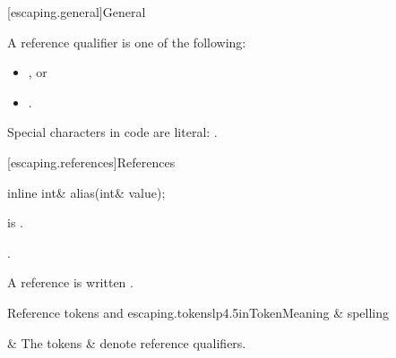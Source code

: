 [escaping.general]{General}

\pnum
A reference qualifier is one of the following:
\begin{itemize}
\item \tcode{\&}, or
\item \tcode{\&\&}.
\end{itemize}
Special characters in code are literal: \tcode{\# \% _ \{ \} \textasciitilde{} \textasciicircum{} \$ \textbackslash{}}.

[escaping.references]{References}

%
\begin{itemdecl}
inline int& alias(int& value);
\end{itemdecl}

\begin{itemdescr}
\pnum
\mandates
{} is .

\pnum
\returns
{}.

\pnum
\remarks
A reference is written .
\begin{libtab2}{Reference tokens \tcode{\&} and \tcode{\&\&}}{escaping.tokens}{lp{4.5in}}{Token}{Meaning \& spelling}

\tcode{\&\&} &
The tokens \tcode{\&} \& \tcode{\&\&} denote reference qualifiers. \\
\end{libtab2}
\end{itemdescr}
